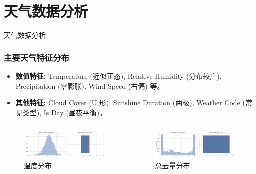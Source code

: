 \documentclass{beamer} %
\begin{document}
\section{天气数据分析}
\begin{frame}{天气数据分析}
    \frametitle{主要天气特征分布}
    \begin{itemize}
        \item \textbf{数值特征:} Temperature (近似正态), Relative Humidity (分布较广), Precipitation (零膨胀), Wind Speed (右偏) 等。
        \item \textbf{其他特征:} Cloud Cover (U 形), Sunshine Duration (两极), Weather Code (常见类型), Is Day (昼夜平衡)。
    \end{itemize}
    \begin{columns}
        \begin{column}{0.48\textwidth}
            \centering
            \begin{figure}
                \includegraphics[width=\textwidth]{../plots/weather_distribution_temperature_2m.png}
                \caption{温度分布}
            \end{figure}
        \end{column}
        \begin{column}{0.48\textwidth}
            \centering
                \begin{figure}
                \includegraphics[width=\textwidth]{../plots/weather_distribution_cloud_cover.png}
                \caption{总云量分布}
            \end{figure}
        \end{column}
    \end{columns}
\end{frame}
\end{document}
